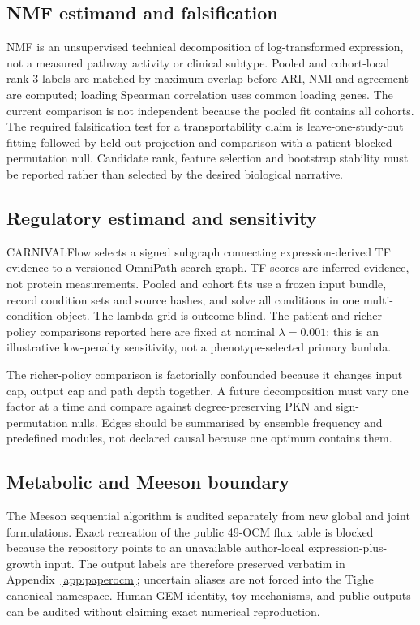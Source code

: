 \documentclass[10pt]{article}
\begin{document}
\subsection{NMF estimand and falsification}

NMF is an unsupervised technical decomposition of log-transformed expression,
not a measured pathway activity or clinical subtype.  Pooled and cohort-local
rank-3 labels are matched by maximum overlap before ARI, NMI and agreement are
computed; loading Spearman correlation uses common loading genes.  The current
comparison is not independent because the pooled fit contains all cohorts.
The required falsification test for a transportability claim is
leave-one-study-out fitting followed by held-out projection and comparison with
a patient-blocked permutation null.  Candidate rank, feature selection and
bootstrap stability must be reported rather than selected by the desired
biological narrative.

\subsection{Regulatory estimand and sensitivity}

CARNIVALFlow selects a signed subgraph connecting expression-derived TF
evidence to a versioned OmniPath search graph.  TF scores are inferred evidence,
not protein measurements.  Pooled and cohort fits use a frozen input bundle,
record condition sets and source hashes, and solve all conditions in one
multi-condition object.  The lambda grid is outcome-blind.  The patient and
richer-policy comparisons reported here are fixed at nominal $\lambda=0.001$;
this is an illustrative low-penalty sensitivity, not a phenotype-selected
primary lambda.

The richer-policy comparison is factorially confounded because it changes input
cap, output cap and path depth together.  A future decomposition must vary one
factor at a time and compare against degree-preserving PKN and sign-permutation
nulls.  Edges should be summarised by ensemble frequency and predefined modules,
not declared causal because one optimum contains them.

\subsection{Metabolic and Meeson boundary}

The Meeson sequential algorithm is audited separately from new global and
joint formulations.  Exact recreation of the public 49-OCM flux table is
blocked because the repository points to an unavailable author-local
expression-plus-growth input.  The output labels are therefore preserved
verbatim in Appendix~\ref{app:paperocm}; uncertain aliases are not forced into
the Tighe canonical namespace.  Human-GEM identity, toy mechanisms, and public
outputs can be audited without claiming exact numerical reproduction.
\end{document}
